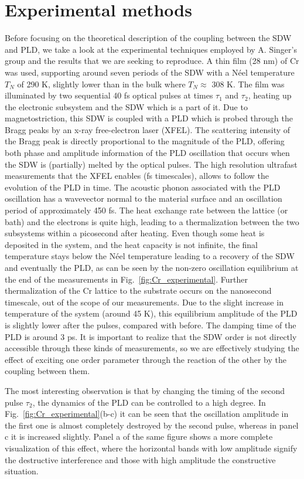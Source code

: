 \section{Experimental methods}
Before focusing on the theoretical description of the coupling between the SDW and PLD, we take a look at the experimental techniques employed by A. Singer's group and the results that we are seeking to reproduce.
A thin film (28 nm) of Cr was used, supporting around seven periods of the SDW with a N\'eel temperature $T_N$ of 290 K, slightly lower than in the bulk where $T_N\approx$ 308 K.
The film was illuminated by two sequential 40 fs optical pulses at times $\tau_1$ and $\tau_2$, heating up the electronic subsystem and the SDW which is a part of it.
Due to magnetostriction, this SDW is coupled with a PLD which is probed through the Bragg peaks by an x-ray free-electron laser (XFEL)\cite{Singer2015}.
The scattering intensity of the Bragg peak is directly proportional to the magnitude of the PLD, offering both phase and amplitude information of the PLD oscillation that occurs when the SDW is (partially) melted by the optical pulses.
The high resolution ultrafast measurements that the XFEL enables (fs timescales), allows to follow the evolution of the PLD in time.
The acoustic phonon associated with the PLD oscillation has a wavevector normal to the material surface and an oscillation period of approximately 450 fs.
The heat exchange rate between the lattice (or bath) and the electrons is quite high, leading to a thermalization between the two subsystems within a picosecond after heating.
Even though some heat is deposited in the system, and the heat capacity is not infinite, the final temperature stays below the N\'eel temperature leading to a recovery of the SDW and eventually the PLD, as can be seen by the non-zero oscillation equilibrium at the end of the measurements in Fig.~\ref{fig:Cr_experimental}.
Further thermalization of the Cr lattice to the substrate occurs on the nanosecond timescale, out of the scope of our measurements.
Due to the slight increase in temperature of the system (around 45 K), this equilibrium amplitude of the PLD is slightly lower after the pulses, compared with before.
The damping time of the PLD is around 3 ps.
It is important to realize that the SDW order is not directly accessible through these kinds of measurements, so we are effectively studying the effect of exciting one order parameter through the reaction of the other by the coupling between them.

The most interesting observation is that by changing the timing of the second pulse $\tau_2$, the dynamics of the PLD can be controlled to a high degree.
In Fig.~\ref{fig:Cr_experimental}(b-c) it can be seen that the oscillation amplitude in the first one is almost completely destroyed by the second pulse, whereas in panel c it is increased slightly.
Panel a of the same figure shows a more complete visualization of this effect, where the horizontal bands with low amplitude signify the destructive interference and those with high amplitude the constructive situation.

